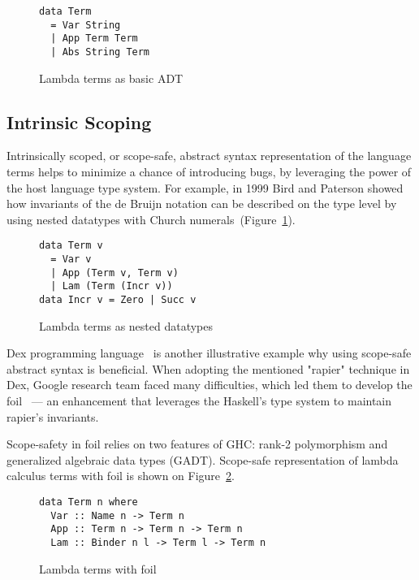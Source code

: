 \begin{figure}[H]
\begin{verbatim}
data Term
  = Var String
  | App Term Term
  | Abs String Term
\end{verbatim}
  \caption{Lambda terms as basic ADT}
\end{figure}

\subsection{Intrinsic Scoping}

Intrinsically scoped, or scope-safe, abstract syntax representation of the language terms helps to minimize a chance of introducing bugs, by leveraging the power of the host language type system. For example, in 1999 Bird and Paterson \cite{BirdPaterson1999_BruijnNested} showed how invariants of the de Bruijn notation can be described on the type level by using nested datatypes \cite{Bird1998_NestedDatatypes} with Church numerals~(Figure~\ref{fig:lambda-bruijn-nested}).

\begin{figure}[H]
  \centering
\begin{verbatim}
data Term v
  = Var v
  | App (Term v, Term v)
  | Lam (Term (Incr v))
data Incr v = Zero | Succ v
\end{verbatim}
  \caption{Lambda terms as nested datatypes}
  \label{fig:lambda-bruijn-nested}
\end{figure}

Dex programming language~\cite{PaszkeDex_2021} is another illustrative example why using scope-safe abstract syntax is beneficial. When adopting the mentioned "rapier" technique in Dex, Google research team faced many difficulties, which led them to develop the foil~\cite{Foil} — an enhancement that leverages the Haskell's type system to maintain rapier's invariants.

Scope-safety in foil relies on two features of GHC: rank-2 polymorphism and generalized algebraic data types (GADT). Scope-safe representation of lambda calculus terms with foil is shown on Figure~\ref{fig:lambda-foil}.

\begin{figure}[H]
\begin{verbatim}
data Term n where
  Var :: Name n -> Term n
  App :: Term n -> Term n -> Term n
  Lam :: Binder n l -> Term l -> Term n
\end{verbatim}
  \caption{Lambda terms with foil}
  \label{fig:lambda-foil}
\end{figure}

